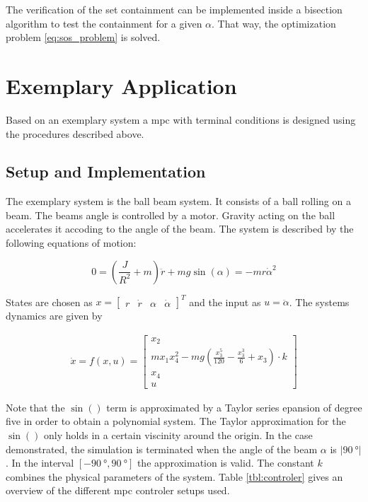 \documentclass[10pt,a4paper]{article}
\begin{document}
The verification of the set containment can be implemented inside a bisection algorithm to test the containment for a given $\alpha$. That way, the optimization problem \eqref{eq:sos_problem}
is solved.










\section{Exemplary Application}
\label{sec:example}

Based on an exemplary system a \gls{mpc} with terminal conditions is designed using the procedures described above. 


\subsection{Setup and Implementation}
The exemplary system is the ball beam system.
It consists of a ball rolling on a beam. The beams angle is controlled by a motor. Gravity acting on the ball accelerates it accoding to the angle of the beam.
The system is described by the following equations of motion:

\begin{equation}
    0 = \left(\frac{J}{R^2} + m\right)\ddot{r} + mg\sin(\alpha) = - mr\dot{\alpha}^2
\end{equation}

States are chosen as $x = \begin{bmatrix} r & \dot{r} & \alpha & \dot{\alpha} \end{bmatrix}^T$ and the input as $u = \ddot{\alpha}$. The systems dynamics are given by

\begin{align}
    \dot{x} = f(x,u) = \begin{bmatrix}
        x_2 \\
        m x_1 x_4^2 - m g \left(\frac{x_3^5}{120} - \frac{x_3^3}{6} + x_3\right) \cdot k \\
        x_4 \\
        u
    \end{bmatrix}
\end{align}

Note that the $\sin()$ term is approximated by a Taylor series epansion of degree five in order to obtain a polynomial system.
The Taylor approximation for the $\sin()$ only holds in a certain viscinity around the origin. In the case demonstrated, the simulation is terminated when
the angle of the beam $\alpha$ is $|\SI{90}{\degree}|$. In the interval $[-\SI{90}{\degree}, \SI{90}{\degree}]$ the approximation is valid.
The constant $k$ combines the physical parameters of the system. Table \ref{tbl:controler} gives an overview of the different \gls{mpc} controler setups used.
\end{document}
